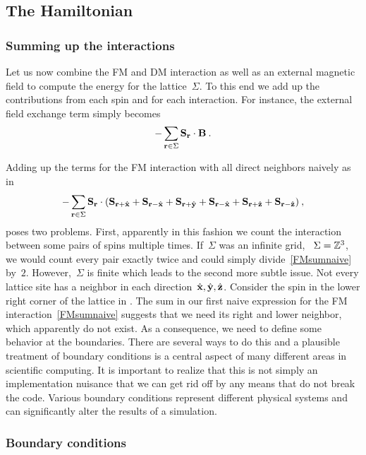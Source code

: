 \subsection{The Hamiltonian}

\subsubsection{Summing up the interactions}

Let us now combine the FM and DM interaction as well as an external magnetic
field to compute the energy for the lattice~$\Sigma$. To this end we add up the
contributions from each spin and for each interaction. For instance, the
external field exchange term simply becomes
%
\begin{equation}\label{Bsum}
  -\sum_{\mathbf{r} \in \Sigma} \mathbf{S}_{\mathbf{r}} \cdot \mathbf{B}\:.
\end{equation}
%

Adding up the terms for the FM interaction with all direct neighbors naively as
in
%
\begin{equation}\label{FMsumnaive}
  -\sum_{\mathbf{r} \in \Sigma} \mathbf{S}_{\mathbf{r}} \cdot (\mathbf{S}_{\mathbf{r} + \hat{\mathbf{x}}} + \mathbf{S}_{\mathbf{r} - \hat{\mathbf{x}}} +
    \mathbf{S}_{\mathbf{r} + \hat{\mathbf{y}}} + \mathbf{S}_{\mathbf{r} - \hat{\mathbf{x}}} + \mathbf{S}_{\mathbf{r} + \hat{\mathbf{z}}} + \mathbf{S}_{\mathbf{r} - \hat{\mathbf{z}}})\:,
\end{equation}
%
poses two problems. First, apparently in this fashion we count the interaction
between some pairs of spins multiple times. If~$\Sigma$ was an infinite grid,
\ie{}~$\Sigma=\mathbb{Z}^3$, we would count every pair exactly twice and could simply
divide~\eqref{FMsumnaive} by~$2$. However,~$\Sigma$ is finite which leads
to the second more subtle issue. Not every lattice site has a neighbor in each
direction~$\hat{\mathbf{x}}, \hat{\mathbf{y}}, \hat{\mathbf{z}}$. Consider the spin in the lower right corner of the
lattice in . The sum in our first naive expression for the
FM interaction~\eqref{FMsumnaive} suggests that we need its right and lower
neighbor, which apparently do not exist. As a consequence, we need to define
some behavior at the boundaries. There are several ways to do this and a
plausible treatment of boundary conditions is a central aspect of many different
areas in scientific computing. It is important to realize that this is not
simply an implementation nuisance that we can get rid off by any means that do
not break the code. Various boundary conditions represent different physical
systems and can significantly alter the results of a simulation.

\subsubsection{Boundary conditions}

